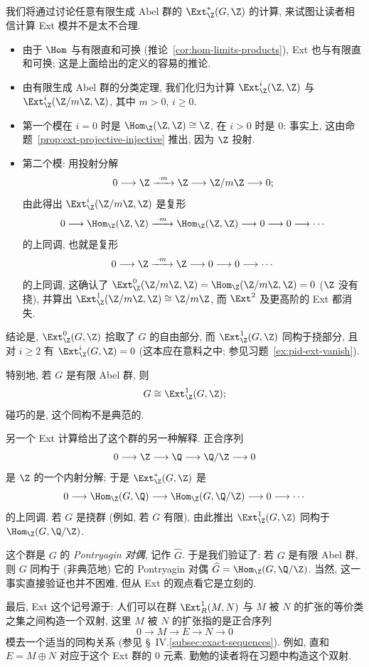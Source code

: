 我们将通过讨论任意有限生成 Abel 群的 $\Ext_\Z^*(G,\Z)$ 的计算, 来试图让读者相信计算 Ext 模并不是太不合理.
\begin{itemize}
\item[---] 由于 $\Hom$ 与有限直和可换 (推论~\ref{cor:hom-limits-products}), Ext 也与有限直和可换; 这是上面给出的定义的容易的推论.
\item[---] 由有限生成 Abel 群的分类定理, 我们化归为计算 $\Ext_\Z^i(\Z,\Z)$ 与 $\Ext_\Z^i(\Z/m\Z,\Z)$, 其中 $m>0$, $i\ge 0$.
\item[---] 第一个模在 $i=0$ 时是 $\Hom_\Z(\Z,\Z)\cong\Z$, 在 $i>0$ 时是 $0$: 事实上, 这由命题~\ref{prop:ext-projective-injective} 推出, 因为 $\Z$ 投射.
\item[---] 第二个模: 用投射分解
\[
0\longrightarrow\Z\xrightarrow{\ \cdot m\ }\Z\longrightarrow\Z/m\Z\longrightarrow 0;
\]
由此得出 $\Ext_\Z^i(\Z/m\Z,\Z)$ 是复形
\[
0\longrightarrow\Hom_\Z(\Z,\Z)\xrightarrow{\ \cdot m\ }\Hom_\Z(\Z,\Z)\longrightarrow 0\longrightarrow 0\longrightarrow\cdots
\]
的上同调, 也就是复形
\[
0\longrightarrow\Z\xrightarrow{\ \cdot m\ }\Z\longrightarrow 0\longrightarrow 0\longrightarrow\cdots
\]
的上同调, 这确认了 $\Ext_\Z^0(\Z/m\Z,\Z)=\Hom_\Z(\Z/m\Z,\Z)=0$ ($\Z$ 没有挠), 并算出 $\Ext_\Z^1(\Z/m\Z,\Z)\cong\Z/m\Z$, 而 $\Ext^2$ 及更高阶的 Ext 都消失.
\end{itemize}
结论是, $\Ext_\Z^0(G,\Z)$ 拾取了 $G$ 的自由部分, 而 $\Ext_\Z^1(G,\Z)$ 同构于挠部分, 且对 $i\ge 2$ 有 $\Ext_\Z^i(G,\Z)=0$ (这本应在意料之中; 参见习题~\ref{ex:pid-ext-vanish}).

特别地, 若 $G$ 是有限 Abel 群, 则
\[
G\cong\Ext_\Z^1(G,\Z);
\]
碰巧的是, 这个同构不是典范的.

另一个 Ext 计算给出了这个群的另一种解释. 正合序列
\[
0\longrightarrow\Z\longrightarrow\Q\longrightarrow\Q/\Z\longrightarrow 0
\]
是 $\Z$ 的一个内射分解; 于是 $\Ext_\Z^*(G,\Z)$ 是
\[
0\longrightarrow\Hom_\Z(G,\Q)\longrightarrow\Hom_\Z(G,\Q/\Z)\longrightarrow 0\longrightarrow\cdots
\]
的上同调. 若 $G$ 是挠群 (例如, 若 $G$ 有限), 由此推出 $\Ext_\Z^1(G,\Z)$ 同构于 $\Hom_\Z(G,\Q/\Z)$.

这个群是 $G$ 的 \emph{Pontryagin 对偶}, 记作 $\widehat{G}$. 于是我们验证了: 若 $G$ 是有限 Abel 群, 则 $G$ 同构于 (非典范地) 它的 Pontryagin 对偶 $\widehat{G}=\Hom_\Z(G,\Q/\Z)$. 当然, 这一事实直接验证也并不困难, 但从 Ext 的观点看它是立刻的.

最后, Ext 这个记号源于: 人们可以在群 $\Ext_R^1(M,N)$ 与 $M$ 被 $N$ 的扩张的等价类之集之间构造一个双射, 这里 $M$ 被 $N$ 的扩张指的是正合序列
\[
0\longrightarrow M\longrightarrow E\longrightarrow N\longrightarrow 0
\]
模去一个适当的同构关系 (参见 \S~IV.\ref{subsec:exact-sequences}). 例如, 直和 $E=M\oplus N$ 对应于这个 Ext 群的 $0$ 元素. 勤勉的读者将在习题中构造这个双射.


